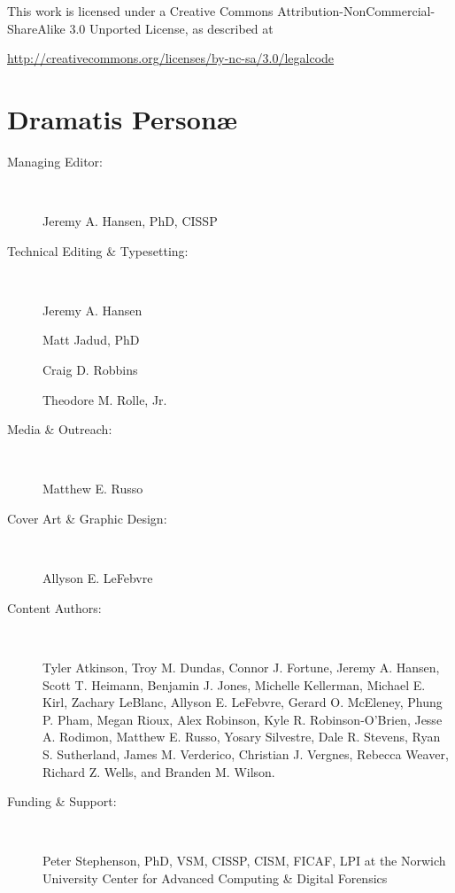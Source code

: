 \documentclass[11pt,final]{book}
\begin{document}
\noindent This work is licensed under a Creative Commons Attribution-NonCommercial-ShareAlike 3.0 Unported License, as described at \newline

\noindent \footnotesize \url{http://creativecommons.org/licenses/by-nc-sa/3.0/legalcode}







   \chapter*{Dramatis Person\ae}

 \begin{description}

 \item[Managing Editor:] ~
 
 Jeremy A. Hansen, PhD, CISSP

 \item[Technical Editing \& Typesetting:] ~
 
 Jeremy A. Hansen
 
 Matt Jadud, PhD
 
 Craig D. Robbins
 
 Theodore M. Rolle, Jr.
 

 \item[Media \& Outreach:] ~
 
 Matthew E. Russo

 \item[Cover Art \& Graphic Design:] ~
 
 Allyson E. LeFebvre

 \item[Content Authors:]\label{ContentAuthors} ~
 
Tyler Atkinson,
Troy M. Dundas,
Connor J. Fortune,
Jeremy A. Hansen,
Scott T. Heimann,
Benjamin J. Jones,
Michelle Kellerman,
Michael E. Kirl,
Zachary LeBlanc,
Allyson E. LeFebvre,
Gerard O. McEleney,
Phung P. Pham,
Megan Rioux,
Alex Robinson,
Kyle R. Robinson-O'Brien,
Jesse A. Rodimon,
Matthew E. Russo,
Yosary Silvestre,
Dale R. Stevens,
Ryan S. Sutherland,
James M. Verderico,
Christian J. Vergnes,
Rebecca Weaver,
Richard Z. Wells, and
Branden M. Wilson.

 \item[Funding \& Support:] ~
 
Peter Stephenson, PhD, VSM, CISSP, CISM, FICAF, LPI at the Norwich University Center for Advanced Computing \& Digital Forensics


\end{description}
\end{document}
